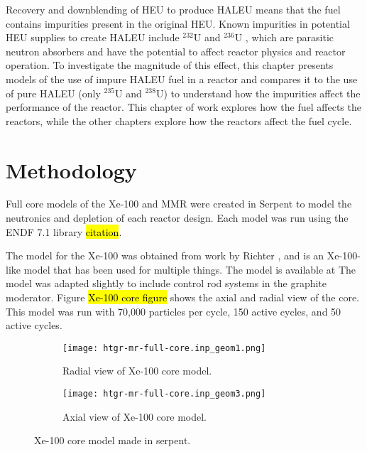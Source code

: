 Recovery and downblending of \gls{HEU} to produce \gls{HALEU} means that 
the fuel contains impurities present in the original
\gls{HEU}. Known impurities in potential \gls{HEU}
supplies to create \gls{HALEU} include $^{232}$U and $^{236}$U
\cite{vaden_isotopic_2018,nelson_foreign_2010},  
which are parasitic neutron absorbers and have the potential to affect 
reactor physics and reactor operation. To investigate the magnitude of this 
effect, this chapter presents models of the use of 
impure \gls{HALEU} fuel in a reactor and compares it to the use of pure 
\gls{HALEU} (only $^{235}$U and $^{238}$U)
to understand how the impurities affect the performance of the reactor.
This chapter of work explores how the fuel affects the reactors, while 
the other chapters explore how the reactors affect the fuel cycle. 

\section{Methodology}
Full core models of the Xe-100 and \gls{MMR} were created in Serpent 
\cite{leppanen_serpent_2014} to model the neutronics and depletion of 
each reactor design. Each model was run using the ENDF 7.1 library
\hl{citation}.

The model for the Xe-100 was obtained from work by Richter 
\cite{richter_phlox_2021}, and is an Xe-100-like model that has been used for 
multiple things. The model is available at \cite{richter_zoerichterphlox_2022}
The model was adapted slightly to include control rod systems in the 
graphite moderator. Figure \hl{Xe-100 core figure} shows the axial and 
radial view of the core. This model was run with 70,000 particles per cycle, 
150 active cycles, and 50 active cycles. 

\begin{figure}
    \centering 
    \begin{subfigure}{0.45\textwidth}
        \centering 
        \texttt{[image: htgr-mr-full-core.inp\_geom1.png]}
        \caption{Radial view of Xe-100 core model.}
        \label{fig:xe100_core_radial}        
    \end{subfigure}
    \hfill
    \begin{subfigure}{0.45\textwidth}
        \centering 
        \texttt{[image: htgr-mr-full-core.inp\_geom3.png]}
        \caption{Axial view of Xe-100 core model.}
        \label{fig:xe100_core_axial}        
    \end{subfigure}
    \caption{Xe-100 core model made in serpent.}
    \label{fig:xe100_core}
\end{figure}



